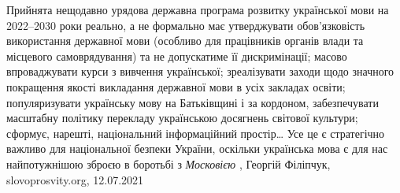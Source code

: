 Прийнята нещодавно урядова державна програма розвитку української мови на
2022–2030 роки реально, а не формально має утверджувати обов’язковість
використання державної мови (особливо для працівників органів влади та
місцевого самоврядування) та не допускатиме її дискримінації; масово
впроваджувати курси з вивчення української; зреалізувати заходи щодо значного
покращення якості викладання державної мови в усіх закладах освіти;
популяризувати українську мову на Батьківщині і за кордоном, забезпечувати
масштабну політику перекладу українською досягнень світової культури; сформує,
нарешті, національний інформаційний простір… Усе це є стратегічно важливо для
національної безпеки України, оскільки українська мова є для нас найпотужнішою
зброєю в боротьбі з \emph{Московією}
, Георгій Філіпчук, slovoprosvity.org, 12.07.2021
